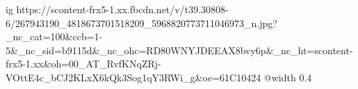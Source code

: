  
 
 
 
 

\ifcmt
  ig https://scontent-frx5-1.xx.fbcdn.net/v/t39.30808-6/267943190_4818673701518209_5968820773711046973_n.jpg?_nc_cat=100&ccb=1-5&_nc_sid=b9115d&_nc_ohc=RD80WNYJDEEAX8bvy6p&_nc_ht=scontent-frx5-1.xx&oh=00_AT_RvfKNqZRj-VOttE4c_bCJ2KLxX6kQk3Sog1qY3RWi_g&oe=61C10424
  @width 0.4
\fi
